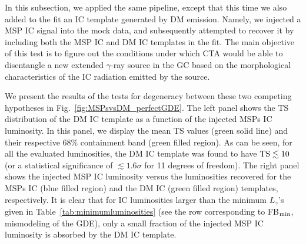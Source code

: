 \documentclass[doublespace,draft,nopageskip]{VTthesis} %
\begin{document}
In this subsection, we applied the same pipeline, except that this time we also added to the fit an IC template generated by DM emission. Namely, we injected a MSP IC signal into the mock data, and subsequently attempted to recover it by including both the MSP IC and DM IC templates in the fit. The main objective of this test is to figure out the conditions under which CTA would be able to disentangle a new extended $\gamma$-ray source in the GC based on the morphological characteristics of the IC radiation emitted by the source.

We present the results of the tests for degeneracy between these two competing hypotheses in Fig.~\ref{fig:MSPsvsDM_perfectGDE}. The left panel shows the TS distribution of the DM IC template as a function of the injected MSPs IC luminosity. In this panel, we display the mean TS values (green solid line) and their respective 68\% containment band (green filled region). As can be seen, for all the evaluated luminosities, the DM IC template was found to have ${\rm TS}\lesssim 10$ (or a statistical significance of $\lesssim 1.6\sigma$ for 11 degrees of freedom). The right panel shows the injected MSP IC luminosity versus the luminosities recovered for the MSPs IC (blue filled region) and the DM IC (green filled region) templates, respectively. It is clear that for IC luminosities larger than the minimum $L_{\gamma}$'s given in Table~\ref{tab:minimumluminosities} (see the row corresponding to FB$_{\rm min}$, mismodeling of the GDE), only a small fraction of the injected MSP IC luminosity is absorbed by the DM IC template. 
\end{document}

